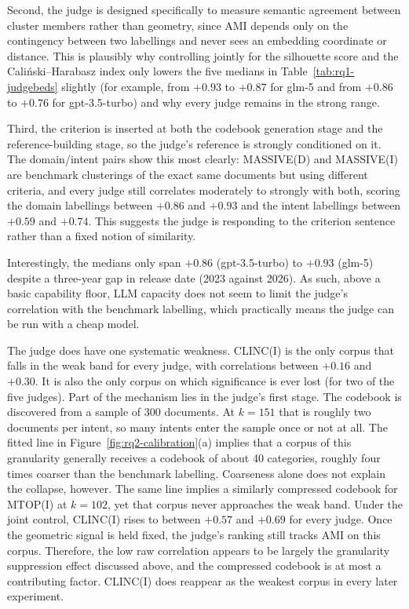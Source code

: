 \documentclass[11pt,a4paper,oneside]{report}
\begin{document}
Second, the judge is designed specifically to measure semantic agreement
between cluster members rather than geometry, since AMI depends only on
the contingency between two labellings and never sees an embedding
coordinate or distance. This is plausibly why controlling jointly for the silhouette score and the Cali\'nski--Harabasz index only lowers the five medians in Table~\ref{tab:rq1-judgebeds} slightly (for example, from
$+0.93$ to $+0.87$ for {\small\ttfamily glm-5} and from $+0.86$ to $+0.76$ for {\small\ttfamily gpt-3.5-turbo}) and why every judge remains in the strong range.

Third, the criterion is inserted at both the codebook generation stage
and the reference-building stage, so the judge's reference is strongly
conditioned on it. The domain/intent pairs show this most clearly:
MASSIVE(D) and MASSIVE(I) are benchmark clusterings of the exact same
documents but using different criteria, and every judge still correlates
moderately to strongly with both, scoring the domain labellings between
$+0.86$ and $+0.93$ and the intent labellings between $+0.59$ and
$+0.74$. This suggests the judge is responding to the criterion sentence
rather than a fixed notion of similarity.

Interestingly, the medians only span $+0.86$ ({\small\ttfamily gpt-3.5-turbo}) to $+0.93$
({\small\ttfamily glm-5}) despite a three-year gap in release date (2023 against 2026). As such,
above a basic capability floor, LLM capacity does not seem to limit the
judge's correlation with the benchmark labelling, which practically means the
judge can be run with a cheap model.

The judge does have one systematic weakness. CLINC(I) is the only corpus
that falls in the weak band for every judge, with correlations between
$+0.16$ and $+0.30$. It is also the only corpus on which significance is
ever lost (for two of the five judges). Part of the mechanism lies in the
judge's first stage. The codebook is discovered from a sample of 300
documents. At $k = 151$ that is roughly two documents per intent, so many
intents enter the sample once or not at all. The fitted line in
Figure~\ref{fig:rq2-calibration}(a) implies that a corpus of this
granularity generally receives a codebook of about 40 categories, roughly
four times coarser than the benchmark labelling. Coarseness alone does
not explain the collapse, however. The same line implies a similarly
compressed codebook for MTOP(I) at $k = 102$, yet that corpus never
approaches the weak band. Under the joint control, CLINC(I) rises to between $+0.57$
and $+0.69$ for every judge. Once the geometric signal is held fixed, the
judge's ranking still tracks AMI on this corpus. Therefore, the low raw correlation
appears to be largely the granularity suppression effect discussed above, and the
compressed codebook is at most a contributing factor. CLINC(I) does reappear
as the weakest corpus in every later experiment.
\end{document}
